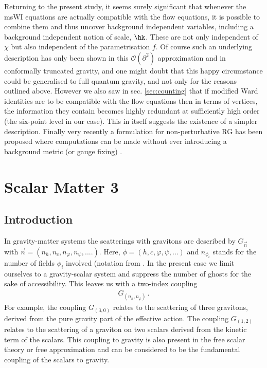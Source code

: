 \documentclass[11pt]{book} %
\begin{document}
Returning to the present study, it seems surely significant that  
whenever the msWI equations  are actually compatible with the flow equations, it is possible to combine them and thus uncover background independent variables, including a background independent notion of scale, $\hk$. These are not only independent of $\chi$ but also independent of the parametrisation $f$. Of course such an underlying description has only been shown in this $\mathcal{O}(\partial^2)$ approximation and in conformally truncated gravity, and one might doubt that this happy circumstance could be generalised to full quantum gravity, and not only for the reasons outlined above. However we also saw in sec. \ref{sec:counting} that if modified Ward identities are to be compatible with the flow equations then in terms of vertices, the information they contain becomes highly redundant at sufficiently high order (the six-point level in our case). This in itself suggests the existence of a simpler description. Finally very recently a formulation for non-perturbative RG has been proposed where computations can be made without ever introducing a background metric (or gauge fixing) \cite{Morris:2016nda}.


\chapter{Scalar Matter 3}

\section{Introduction}
In gravity-matter systems the scatterings with gravitons are described
by $G_{\vec n}$ with $\vec n=(n_h, n_c,n_\varphi,n_\psi,....)$. Here,
$\phi=(h,c,\varphi,\psi,...)$ and $n_{\phi_i}$ stands for the number
of fields $\phi_i$ involved (notation from \cite{Meibohm:2016mkp} . In
the present case we limit ourselves to a gravity-scalar system and
suppress the number of ghosts for the sake of accessibility. This
leaves us with a two-index coupling
\begin{align}
G_{(n_h,n_\varphi)}\,.
\end{align}
For example, the coupling $G_{(3, 0)}$ relates to the scattering of
three gravitons, derived from the pure gravity part of the effective
action. The coupling $G_{(1,2)}$ relates to the scattering of a
graviton on two scalars derived from the kinetic term of the
scalars. This coupling to gravity is also present in the free scalar
theory or free approximation and can be considered to be the
fundamental coupling of the scalars to gravity.
\end{document}
